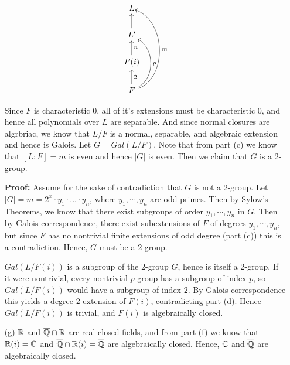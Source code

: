 \documentclass[12pt]{article}
\begin{document}
\begin{solution}
\begin{enumerate}
        \[
        \begin{tikzcd}
        L \\
        L' \arrow[u] \\
        F(i) \arrow[swap]{u}{n} \\
        F \arrow[swap]{u} {2} \arrow[bend left=-60, shorten >=-2pt, swap]{uu}{p} \arrow[bend left=-70, shorten >=-4pt, swap]{uuu}{m}
        \end{tikzcd}
        \]
        
        Since $F$ is characteristic $0$, all of it's extensions must be characteristic $0$, and hence all polynomials over $L$ are separable. And since normal closures are algrbriac, we know that $L/F$ is a normal, separable, and  algebraic extension and hence is Galois. 
        Let $G = Gal(L/F)$. Note that from part (c) we know that $[L:F] = m$ is even and hence $|G|$ is even. Then we claim that $G$ is a $2$-group. 
        
        \textbf{Proof:}
        Assume for the sake of contradiction that $G$ is not a $2$-group. Let $|G| = m = 2^x \cdot y_1 \cdot \ldots \cdot y_n$, where $y_1, \cdots, y_n$ are odd primes. Then by Sylow's Theorems, we know that there exist subgroups of order $y_1, \cdots, y_n$ in $G$. Then by Galois correspondence, there exist subextensions of $F$ of degrees $y_1, \cdots, y_n$, but since $F$ has no nontrivial finite extensions of odd degree (part (c)) this is a contradiction. Hence, $G$ must be a $2$-group. 

        $Gal(L/F(i))$ is a subgroup of the $2$-group $G$, hence is itself a $2$-group. If it were nontrivial, every nontrivial $p$-group has a subgroup of index $p$, so$ Gal(L/F(i))$ would have a subgroup of index $2$. By Galois correspondence this yields a degree-$2$ extension of $F(i)$, contradicting part (d). Hence $Gal(L/F(i))$ is trivial, and $F(i)$ is algebraically closed. 
        

        \item [(g)] $\mathbb R$ and $\overline{\mathbb Q}\cap \mathbb R$ are real closed fields, and from part (f) we know that $\mathbb R(i) = \mathbb C$ and $\overline{\mathbb Q }\cap \mathbb R(i) = \overline{\mathbb Q}$ are algebraically closed. Hence, $\mathbb C$ and $\overline{\mathbb Q}$ are algebraically closed. 
    \end{enumerate}
\end{solution}
\end{document}
